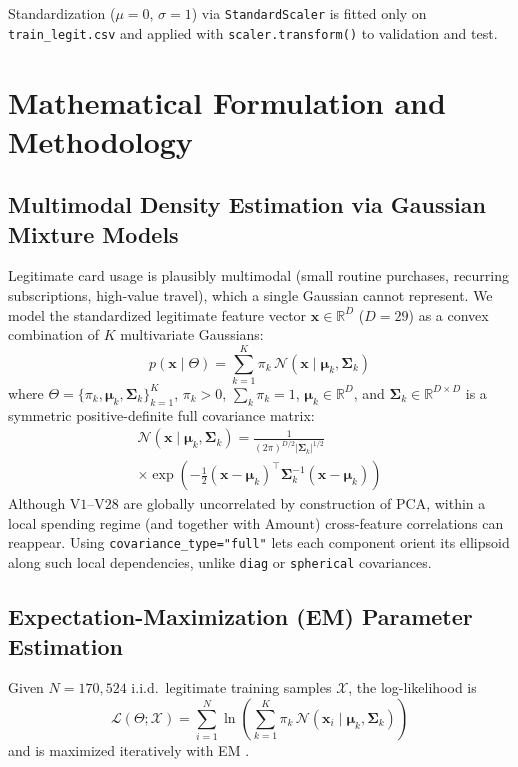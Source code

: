 \documentclass[conference]{IEEEtran}
\begin{document}
Standardization ($\mu = 0$, $\sigma = 1$) via \texttt{StandardScaler} \cite{pedregosa2011} is fitted only on \texttt{train\_legit.csv} and applied with \texttt{scaler.transform()} to validation and test.

\section{Mathematical Formulation and Methodology}

\subsection{Multimodal Density Estimation via Gaussian Mixture Models}
Legitimate card usage is plausibly multimodal (small routine purchases, recurring subscriptions, high-value travel), which a single Gaussian cannot represent. We model the standardized legitimate feature vector $\mathbf{x} \in \mathbb{R}^{D}$ ($D = 29$) as a convex combination of $K$ multivariate Gaussians:
\begin{equation}
p(\mathbf{x} \mid \Theta) = \sum_{k=1}^{K} \pi_k \, \mathcal{N}(\mathbf{x} \mid \boldsymbol{\mu}_k, \boldsymbol{\Sigma}_k)
\end{equation}
where $\Theta = \{\pi_k, \boldsymbol{\mu}_k, \boldsymbol{\Sigma}_k\}_{k=1}^{K}$, $\pi_k > 0$, $\sum_k \pi_k = 1$, $\boldsymbol{\mu}_k \in \mathbb{R}^{D}$, and $\boldsymbol{\Sigma}_k \in \mathbb{R}^{D \times D}$ is a symmetric positive-definite full covariance matrix:
\begin{multline}
\mathcal{N}(\mathbf{x} \mid \boldsymbol{\mu}_k, \boldsymbol{\Sigma}_k) = \frac{1}{(2\pi)^{D/2} |\boldsymbol{\Sigma}_k|^{1/2}} \\
\times \exp \left( -\tfrac{1}{2} (\mathbf{x} - \boldsymbol{\mu}_k)^{\top} \boldsymbol{\Sigma}_k^{-1} (\mathbf{x} - \boldsymbol{\mu}_k) \right)
\end{multline}
Although $\text{V1}$--$\text{V28}$ are globally uncorrelated by construction of PCA, within a local spending regime (and together with $\text{Amount}$) cross-feature correlations can reappear. Using \texttt{covariance\_type="full"} lets each component orient its ellipsoid along such local dependencies, unlike \texttt{diag} or \texttt{spherical} covariances.

\subsection{Expectation-Maximization (EM) Parameter Estimation}
Given $N = 170{,}524$ i.i.d.\ legitimate training samples $\mathcal{X}$, the log-likelihood is
\begin{equation}
\mathcal{L}(\Theta; \mathcal{X}) = \sum_{i=1}^{N} \ln \left( \sum_{k=1}^{K} \pi_k \, \mathcal{N}(\mathbf{x}_i \mid \boldsymbol{\mu}_k, \boldsymbol{\Sigma}_k) \right)
\end{equation}
and is maximized iteratively with EM \cite{dempster1977}.
\end{document}
